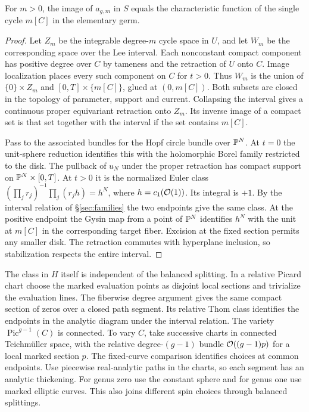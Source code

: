\begin{proposition}\label{prop:local}
For $m>0$, the image of $a_{g,m}$ in $S$ equals the characteristic
function of the single cycle $m[C]$ in the elementary germ.
\end{proposition}
\begin{proof}
Let $Z_m$ be the integrable degree-$m$ cycle space in $U$, and let
$W_m$ be the corresponding space over the Lee interval. Each nonconstant
compact component has positive degree over $C$ by tameness and the
retraction of $U$ onto $C$. Image localization
\cite[Proposition~3.2]{IP} places every such component on $C$ for
$t>0$. Thus $W_m$ is the union of $\{0\}\times Z_m$ and
$[0,T]\times\{m[C]\}$, glued at $(0,m[C])$. Both subsets are closed
in the topology of parameter, support and current. Collapsing the
interval gives a continuous proper equivariant retraction onto $Z_m$.
Its inverse image of a compact set is that set together with the
interval if the set contains $m[C]$.

Pass to the associated bundles for the Hopf circle bundle over $\mathbb P^N$.
At $t=0$ the unit-sphere reduction identifies this with the holomorphic
Borel family restricted to the disk. The pullback of $u_N$ under the
proper retraction has compact support on $\mathbb P^N\times[0,T]$. At $t>0$
it is the normalized Euler class
$(\prod_jr_j)^{-1}\prod_j(r_jh)=h^N$, where $h=c_1(\mathcal O(1))$.
Its integral is $+1$. By the interval relation of \S\ref{sec:families}
the two endpoints give the same class. At the positive endpoint the
Gysin map from a point of $\mathbb P^N$ identifies $h^N$ with the unit at
$m[C]$ in the corresponding target fiber. Excision at the fixed section
permits any smaller disk. The retraction commutes with hyperplane
inclusion, so stabilization respects the entire interval.
\end{proof}

The class in $H$ itself is independent of the balanced splitting.
In a relative Picard chart choose the marked evaluation points as
disjoint local sections and trivialize the evaluation lines. The
fiberwise degree argument gives the same compact section of zeros
over a closed path segment. Its relative Thom class identifies the
endpoints in the analytic diagram under the interval relation.
The variety $\operatorname{Pic}^{g-1}(C)$ is connected. To vary $C$,
take successive charts in connected Teichmüller space, with the
relative degree-$(g-1)$ bundle $\mathcal O((g-1)p)$ for a local marked section
$p$. The fixed-curve comparison identifies choices at common endpoints.
Use piecewise real-analytic paths in the charts, so each segment has
an analytic thickening. For genus zero use the constant sphere and for
genus one use marked elliptic curves. This also joins different spin
choices through balanced splittings.

